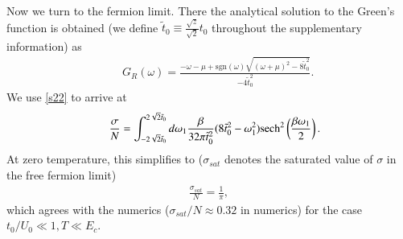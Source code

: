 \documentclass[twocolumn,floatfix,superscriptaddress]{revtex4-1}
\begin{document}
\begin{widetext}
Now we turn to the fermion limit.  There the analytical solution to
the Green's function is obtained (we define $\tilde t_0\equiv
\frac{\sqrt z}{\sqrt 2} t_0$ throughout the supplementary information) as
 \begin{eqnarray}
 &&G_R(\omega)=\frac{-\omega-\mu+\text{sgn}(\omega)\sqrt{(\omega+\mu)^2-8\tilde t_0^2}}{-4\tilde t_0^2}.
 \end{eqnarray}
We use \eqref{s22} to arrive at
 \begin{eqnarray}
 \label{sigma_cf}
&&  \frac{\sigma}{N}
=\int_{-2\sqrt 2 \tilde t_0}^{2\sqrt 2 \tilde t_0}
   d\omega_1\frac{\beta}{32\pi \tilde t_0^2}(8\tilde
   t_0^2-\omega_1^2){\rm sech}^2\left(\frac{\beta \omega_1}{2}\right).
 \end{eqnarray}
At zero temperature, this simplifies to ($\sigma_{sat}$ denotes the saturated value of $\sigma$ in the free fermion limit)
 \begin{eqnarray}
 \label{0T}
 \frac{\sigma_{sat}}{N}=\frac{1}{\pi},
 \end{eqnarray}
 which agrees with the numerics ($\sigma_{sat}/N\approx 0.32$ in numerics) for the case $t_0/U_0\ll 1, T\ll E_c$.


\end{widetext}
\end{document}
